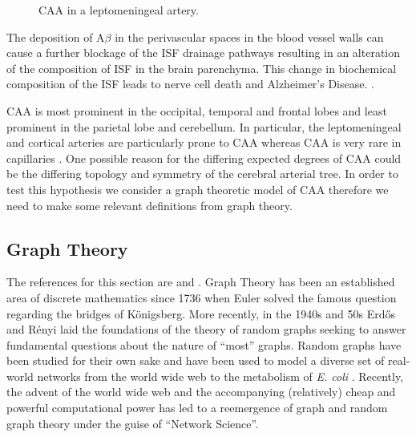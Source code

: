 \documentclass[12pt]{article} %
\theoremstyle{definition}
\begin{document}
\begin{figure}[H]

              \centering
                \caption{CAA in a leptomeningeal artery.}
\end{figure}

The deposition of A$\beta$ in the perivascular spaces in the  blood vessel walls can cause a further blockage of the ISF drainage pathways resulting in an alteration of the composition of ISF in the brain parenchyma. This change in biochemical composition of the ISF leads to nerve cell death and Alzheimer's Disease. \cite{Rox}.  

CAA  is most prominent in the occipital, temporal and frontal lobes and least prominent in the parietal lobe and cerebellum.  In particular,  the leptomeningeal and cortical arteries are particularly prone to CAA whereas CAA is very rare in capillaries \cite{Preston}.  One possible reason for the differing expected degrees of CAA could be the differing topology and symmetry of the cerebral arterial tree.  In order to test this hypothesis we consider a graph theoretic model of CAA therefore we need to make some relevant definitions from graph theory.  





\subsection{Graph Theory}\label{trees}  The references for this section are \cite{Bela} 
and \cite{varietiesofincreasingtrees}.
Graph Theory has been an established area of discrete mathematics since 1736 when Euler 
solved the famous question regarding the bridges of K\"{o}nigsberg.  More recently, in the 
1940s and 50s Erd\H{o}s and R\'{e}nyi laid the foundations of the theory of random graphs 
seeking to answer fundamental questions about the nature of ``most'' graphs. Random graphs 
have been studied for their own sake and have been used to model a diverse set of real-world 
networks from the world wide web to the metabolism of \emph{E. coli} \cite{barabasi}. Recently, the advent of the world wide web and the accompanying %
(relatively) cheap and powerful computational power has led to a reemergence of graph and 
random graph theory under the guise of ``Network Science''. 
\end{document}

